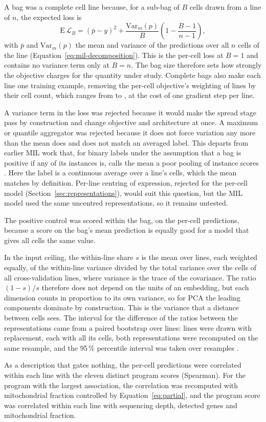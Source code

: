 A bag was a complete cell line because, for a sub-bag of $B$ cells drawn from a line of $n$, the expected
loss is
\begin{equation}
  \mathrm{E}\,\mathcal{L}_B = \left(\bar p - y\right)^2 + \frac{\mathrm{Var}_m(p)}{B}\left(1 - \frac{B-1}{n-1}\right),
  \label{eq:subbag}
\end{equation}
with $\bar p$ and $\mathrm{Var}_m(p)$ the mean and variance of the predictions over all $n$ cells of the line
(Equation~\ref{eq:mil-decomposition}). This is the per-cell loss at $B = 1$ and contains no variance term
only at $B = n$. The bag size
therefore sets how strongly the objective charges for the quantity under study. Complete bags also make
each line one training example, removing the per-cell objective's weighting of lines by their cell count,
which ranges from \CellsMin{} to \CellsMax{}, at the cost of one gradient step per line.

A variance term in the loss was rejected
because it would make the spread stage pass by construction and change objective and architecture at
once. A maximum or quantile aggregator was rejected because it does not force variation any more than the mean does and does
not match an averaged label. This departs from earlier MIL work that, for binary labels under the assumption
that a bag is positive if any of its instances is, calls the mean a poor pooling of instance scores
\cite{ilse2018}. Here the label is a continuous average over a line's cells, which the mean matches by
definition. Per-line centring of expression, rejected for the per-cell model (Section~\ref{sec:representations}), would
suit this question, but the MIL model used the same uncentred representations, so it remains untested.

The positive control was scored within the bag, on the per-cell predictions, because a score on the
bag's mean prediction is equally good for a model that gives all cells the same value.

In the input ceiling, the within-line share $s$ is the mean over lines, each weighted equally, of the within-line variance
divided by the total variance over the cells of all cross-validation lines, where variance is the trace
of the covariance. The ratio $(1-s)/s$ therefore does not depend on the units of an embedding, but each
dimension counts in proportion to its own variance, so for PCA the leading components dominate by
construction. This is the variance that a distance between cells sees. The interval for the difference
of the ratios between the representations came from a paired bootstrap over lines: lines were drawn
with replacement, each with all its cells, both representations were recomputed on the same resample,
and the 95\,\% percentile interval was taken over \BtwBootB{} resamples \cite{efron1993,lazic2010}.

As a description that gates nothing, the per-cell predictions were correlated within each line with the
eleven distinct program scores (Spearman). For the program with the largest association, the
correlation was recomputed with mitochondrial fraction controlled by Equation~\ref{eq:partial}, and the
program score was correlated within each line with sequencing depth, detected genes and mitochondrial
fraction.
